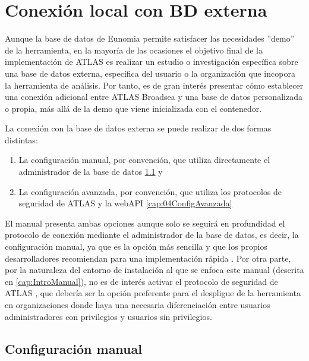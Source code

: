 \chapter{Conexión local con BD externa} \label{cap:04BDEXt}

Aunque la base de datos de Eunomia permite satisfacer las necesidades ''demo'' de la herramienta, en la mayoría de las ocasiones el objetivo final de la implementación de ATLAS es realizar un estudio o investigación específica sobre una base de datos externa, específica del usuario o la organización que incopora la herramienta de análisis. Por tanto, es de gran interés presentar cómo establecer una conexión adicional entre ATLAS Broadsea y una base de datos personalizada o propia, más allá de la demo que viene inicializada con el contenedor.

La conexión con la base de datos externa se puede realizar de dos formas distintas: 

\begin{enumerate}
    \item La configuración manual, por convención, que utiliza directamente el administrador de la base de datos \ref{cap:04ConfiguracionPgAdmin} y 
    \item La configuración avanzada, por convención, que utiliza los protocolos de seguridad de ATLAS y la webAPI \ref{cap:04ConfigAvanzada}
\end{enumerate}

El manual presenta ambas opciones aunque solo se seguirá en profundidad el protocolo de conexión mediante el administrador de la base de datos, es decir, la configuración manual, ya que es la opción más sencilla y que los propios desarrolladores recomiendan para una implementación rápida \cite{forumAddMSDB}. Por otra parte, por la naturaleza del entorno de instalación al que se enfoca este manual (descrita en \ref{cap:IntroManual}), no es de interés activar el protocolo de seguridad de ATLAS , que debería ser la opción preferente para el despligue de la herramienta en organizaciones donde haya una necesaria diferenciación entre usuarios administradores con privilegios y usuarios sin privilegios. 


\section{Configuración manual} \label{cap:04ConfiguracionPgAdmin}

